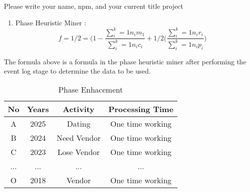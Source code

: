 Please write your name, npm, and your current title project

\begin{enumerate}
    \item Phase Heuristic Miner :
    \begin{equation}
        f=1/2=\bigg(1-\frac{\sum_{i}^{k}= 1 n_{i}m_{1}}{\sum_{i}^{k} = 1 n_{i}c_{i}}\bigg+ 1/2\big(\frac{\sum_{i}^{k}=1 n_{i}r_{i}}{\sum_{i}^{k}= 1 n_{i}p_{i}}\bigg)
    \end{equation}
\end{enumerate}
\par
The formula above is a formula in the phase heuristic miner after performing the event log stage to determine the data to be used.

\begin{center}
    \begin{table}[hhhh]
    \caption{Phase Enhacement}
        \centering
        \begin{tabular}{cccc}
        \hline No & Years & Activity & Processing Time\\
        \hline
            A & 2025 & Dating & One time working  \\
            B & 2024 & Need Vendor & One time working  \\
            C & 2023 & Lose Vendor & One time working  \\
            ... & ... & ... & ...  \\
            O & 2018 & Vendor & One time working  \\
        \hline
        \end{tabular}
    \end{table}
\end{center}